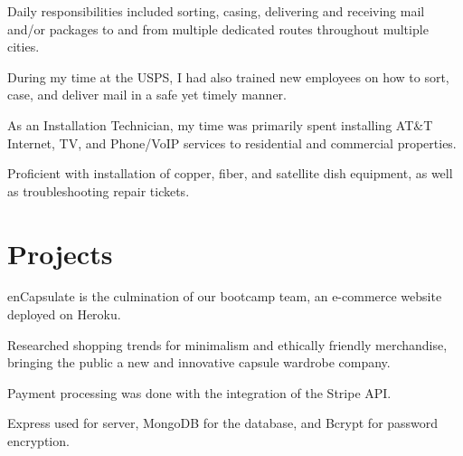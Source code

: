 \documentclass[]{deedy-resume-openfont}
\begin{document}
\begin{minipage}[t]{0.66\textwidth}
\begin{tightemize}
\item Daily responsibilities included sorting, casing, delivering and receiving mail and/or packages to and from multiple dedicated routes throughout multiple cities.
\item During my time at the USPS, I had also trained new employees on how to sort, case, and deliver mail in a safe yet timely manner. 
\end{tightemize}
\sectionsep

\begin{tightemize}
\item As an Installation Technician, my time was primarily spent installing AT\&T Internet, TV, and Phone/VoIP services to residential and commercial properties.
\item Proficient with installation of copper, fiber, and satellite dish equipment, as well as troubleshooting repair tickets.
\end{tightemize}
\sectionsep




\section{Projects}
\begin{tightemize}
\item enCapsulate is the culmination of our bootcamp team, an e-commerce website deployed on Heroku. 
\item Researched shopping trends for minimalism and ethically friendly merchandise, bringing the public a new and innovative capsule wardrobe company.
\item Payment processing was done with the integration of the Stripe API.
\item Express used for server, MongoDB for the database, and Bcrypt for password encryption. 
\end{tightemize}
\sectionsep


\end{minipage}
\end{document}
